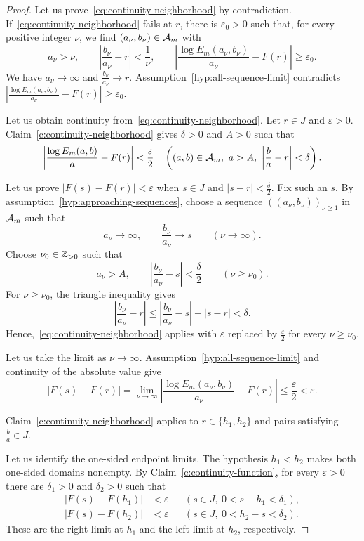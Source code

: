 \begin{proof}
 Let us prove~\eqref{eq:continuity-neighborhood} by contradiction.
If~\eqref{eq:continuity-neighborhood} fails at $r$, there is $\varepsilon_0>0$
such that, for every positive integer $\nu$, we find $(a_\nu,b_\nu)\in\mathcal A_m$ with
\[
 a_\nu>\nu,\qquad
 \left|\frac{b_\nu}{a_\nu}-r\right|<\frac1\nu,\qquad
 \left|\frac{\log E_m(a_\nu,b_\nu)}{a_\nu}-F(r)\right|\ge\varepsilon_0.
\]
We have $a_\nu\to\infty$ and $\frac{b_\nu}{a_\nu}\to r$.
Assumption~\ref{hyp:all-sequence-limit} contradicts
$|\frac{\log E_m(a_\nu,b_\nu)}{a_\nu}-F(r)|\ge\varepsilon_0$.

 Let us obtain continuity from~\eqref{eq:continuity-neighborhood}.
Let $r\in J$ and $\varepsilon>0$.
Claim~\ref{c:continuity-neighborhood} gives $\delta>0$ and $A>0$ such that
\[
 \left|\frac{\log E_m(a,b)}a-F(r)\right|<\frac\varepsilon2
 \quad\left((a,b)\in\mathcal A_m,\ a>A,\ \left|\frac ba-r\right|<\delta\right).
\]

Let us prove $|F(s)-F(r)|<\varepsilon$ when $s\in J$ and $|s-r|<\frac\delta2$.
Fix such an $s$.
By assumption~\ref{hyp:approaching-sequences}, choose a sequence $((a_\nu,b_\nu))_{\nu\ge1}$ in $\mathcal A_m$ such that
\[
 a_\nu\longrightarrow\infty,\qquad \frac{b_\nu}{a_\nu}\longrightarrow s
 \qquad(\nu\longrightarrow\infty).
\]
Choose $\nu_0\in\mathbb Z_{>0}$ such that
\[
 a_\nu>A,\qquad
 \left|\frac{b_\nu}{a_\nu}-s\right|<\frac\delta2
 \qquad(\nu\ge\nu_0).
\]
For $\nu\ge\nu_0$, the triangle inequality gives
\[
 \left|\frac{b_\nu}{a_\nu}-r\right|
 \le\left|\frac{b_\nu}{a_\nu}-s\right|+|s-r|<\delta.
\]
Hence,~\eqref{eq:continuity-neighborhood} applies with $\varepsilon$ replaced by $\frac\varepsilon2$ for every $\nu\ge\nu_0$.

Let us take the limit as $\nu\to\infty$.
Assumption~\ref{hyp:all-sequence-limit} and continuity of the absolute value give
\[
 |F(s)-F(r)|
 =\lim_{\nu\to\infty}\left|\frac{\log E_m(a_\nu,b_\nu)}{a_\nu}-F(r)\right|
 \le\frac\varepsilon2<\varepsilon.
\]

Claim~\ref{c:continuity-neighborhood} applies to $r\in\{h_1,h_2\}$ and pairs satisfying $\frac ba\in J$.

 Let us identify the one-sided endpoint limits.
The hypothesis $h_1<h_2$ makes both one-sided domains nonempty.
By Claim~\ref{c:continuity-function}, for every $\varepsilon>0$ there are $\delta_1>0$ and $\delta_2>0$ such that
\[
\begin{aligned}
 |F(s)-F(h_1)|&<\varepsilon
 &&(s\in J,\ 0<s-h_1<\delta_1),\\
 |F(s)-F(h_2)|&<\varepsilon
 &&(s\in J,\ 0<h_2-s<\delta_2).
\end{aligned}
\]
These are the right limit at $h_1$ and the left limit at $h_2$, respectively.
\end{proof}


